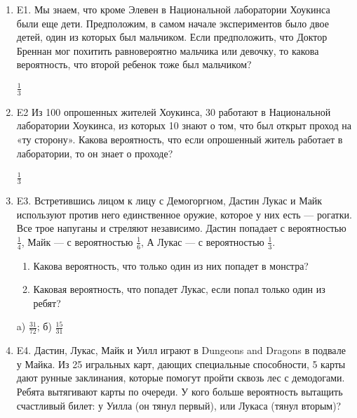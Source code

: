\documentclass[12pt]{article}
\newenvironment{problem}{}{}
\newenvironment{sol}{}{} %
\begin{document}
\begin{enumerate}
\begin{problem}
\item[E1.] Мы знаем, что кроме Элевен в Национальной лаборатории Хоукинса были еще дети. Предположим, в самом начале экспериментов было двое детей, один из которых был мальчиком. Если предположить, что Доктор Бреннан мог похитить равновероятно мальчика или девочку, то какова вероятность, что второй ребенок тоже был мальчиком?

\begin{sol}
$\frac{1}{3}$
\end{sol}
\end{problem}

\begin{problem}
\item[E2] Из 100 опрошенных жителей Хоукинса, 30 работают в Национальной лаборатории Хоукинса, из которых 10 знают о том, что был открыт проход на «ту сторону». Какова вероятность, что если опрошенный житель работает в лаборатории, то он знает о проходе?

\begin{sol}
$\frac{1}{3}$
\end{sol}
\end{problem}

\begin{problem}
\item[E3.] Встретившись лицом к лицу с Демогоргном, Дастин Лукас и Майк используют против него единственное оружие, которое у них есть — рогатки. Все трое напуганы и стреляют независимо. Дастин попадает с вероятностью $\frac{1}{4}$, Майк — с вероятностью $\frac{1}{6}$, А Лукас — с вероятностью $\frac{1}{3}$.

\begin{enumerate}
\item Какова вероятность, что только один из них попадет в монстра?
\item Каковая вероятность, что попадет Лукас, если попал только один из ребят?
\end{enumerate}

\begin{sol}
a) $\frac{31}{72}$; б) $\frac{15}{31} $
\end{sol}
\end{problem}

\begin{problem}
\item[E4.]  Дастин, Лукас, Майк и Уилл играют в Dungeons and Dragons в подвале у Майка. Из 25 игральных карт, дающих специальные способности, 5 карты дают рунные заклинания, которые помогут пройти сквозь лес с демодогами. Ребята вытягивают карты по очереди. У кого больше вероятность вытащить счастливый билет: у Уилла (он тянул первый), или Лукаса (тянул вторым)?


\end{problem}
\end{enumerate}
\end{document}
